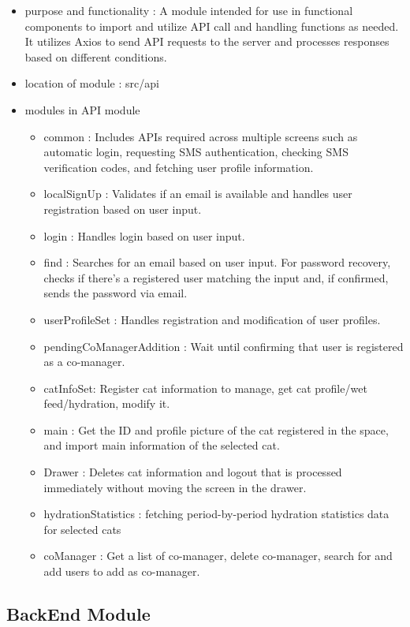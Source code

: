 \documentclass[conference]{IEEEtran}
\begin{document}
\begin{itemize}
    \item purpose and functionality : A module intended for use in functional components to import and utilize API call and handling functions as needed. It utilizes Axios to send API requests to the server and processes responses based on different conditions.
    \item location of module : src/api
    \item modules in API module
    \begin{itemize}
        \item common : Includes APIs required across multiple screens such as automatic login, requesting SMS authentication, checking SMS verification codes, and fetching user profile information.
        \item localSignUp : Validates if an email is available and handles user registration based on user input.
        \item login : Handles login based on user input.
        \item find : Searches for an email based on user input. For password recovery, checks if there's a registered user matching the input and, if confirmed, sends the password via email.
        \item userProfileSet : Handles registration and modification of user profiles.
        \item pendingCoManagerAddition : Wait until confirming that user is registered as a co-manager.
        \item catInfoSet: Register cat information to manage, get cat profile/wet feed/hydration, modify it.
        \item main : Get the ID and profile picture of the cat registered in the space, and import main information of the selected cat.
        \item Drawer : Deletes cat information and logout that is processed immediately without moving the screen in the drawer.
        \item hydrationStatistics : fetching period-by-period hydration statistics data for selected cats
        \item coManager : Get a list of co-manager, delete co-manager, search for and add users to add as co-manager.
        \vspace{0.5cm}
    \end{itemize}
\end{itemize}

\subsection{BackEnd Module}
\end{document}
